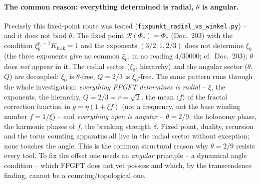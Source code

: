 \paragraph{The common reason: everything determined is radial, $\theta$ is angular.} Precisely this
fixed-point route was tested (\texttt{fixpunkt\_radial\_vs\_winkel.py}) -- and it does not bind $\theta$.
The fixed point $\mathcal R(\Phi_*)=\Phi_*$ (Doc.~203) with the condition $\xi_0^{p_i-1}K_{\text{frak}}=1$
and the exponents $(3/2,1,2/3)$ does not determine $\xi_0$ (the three exponents give no common $\xi_0$, in no reading $4/30000$; cf.\ Doc.~203);
$\theta$ does \emph{not} appear in it. The radial sector ($\xi_0$,
hierarchy) and the angular sector ($\theta$, $Q$) are decoupled: $\xi_0$ is $\theta$-free, $Q=2/3$ is
$\xi_0$-free. The same pattern runs through the whole investigation: \emph{everything FFGFT determines is
radial} -- $\xi$, the exponents, the hierarchy, $Q=2/3=r{=}\sqrt2$, the mean $\langle f\rangle$ of the fractal correction function in $g = \eta(1+\xi f)$ (not a frequency, not the base winding number $f = 1/\xi$) -- and
\emph{everything open is angular} -- $\theta=2/9$, the holonomy phase, the harmonic phases of $f$, the
breaking strength $\delta$. Fixed point, duality, recursion and the torus counting apparatus all live in
the radial sector without exception; none touches the angle. This is the common structural reason why
$\theta=2/9$ resists every tool. To fix the offset one needs an \emph{angular} principle -- a dynamical
angle condition -- which FFGFT does not yet possess and which, by the transcendence finding, cannot be a
counting/topological one.

